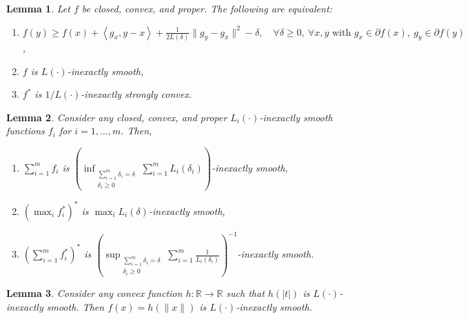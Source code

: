 \documentclass[10pt,a4paper]{amsart}
\newtheorem{lemma}{Lemma}
\newcommand{\R}{\mathbb{R}}
\newcommand{\inner}[2]{\left\langle {#1}, {#2} \right\rangle}
\begin{document}
\begin{lemma}\label{lemma:L(delta) conjugate equivalence}
    Let $f$ be closed, convex, and proper. The following are equivalent:
    \begin{enumerate}        
        \item $f(y) \geq f(x) + \inner{g_x}{y-x}+\frac{1}{2L(\delta)}\|g_y-g_x\|^2 - \delta, \quad \forall \delta \geq 0, \ \forall x,y \text{ with } g_x \in \partial f(x),\ g_y\in \partial f(y)$,
        \item $f$ is $L(\cdot)$-inexactly smooth,
        \item $f^*$ is $1/L(\cdot)$-inexactly strongly convex. %
    \end{enumerate}
\end{lemma}

\begin{lemma}\label{lemma:L(delta) sums and max calculus}
    Consider any closed, convex, and proper $L_i(\cdot)$-inexactly smooth functions $f_i$ for $i=1,\dots,m$. Then, \begin{enumerate}
        \item $\sum_{i=1}^m f_i$ is $\left(\inf_{\substack{\sum_{i=1}^m \delta_i = \delta\\ \delta_i \geq 0}} \sum_{i=1}^m L_i(\delta_i)\right)$-inexactly smooth,
        \item $(\max_i f_i^*)^*$ is $\max_i L_i(\delta)$-inexactly smooth,
        \item $\left(\sum_{i=1}^m f_i^*\right)^*$ is $\left(\sup_{\substack{\sum_{i=1}^m \delta_i = \delta\\ \delta_i \geq 0}} \sum_{i=1}^m \frac{1}{L_i(\delta_i)}\right)^{-1}$-inexactly smooth.
    \end{enumerate}
\end{lemma}

\begin{lemma}\label{composing with abs to norm}
    Consider any convex function $h : \R \to \R $ such that $h(|t|)$ is $L(\cdot)$-inexactly smooth. Then $f(x) = h(\|x\|)$ is $L(\cdot)$-inexactly smooth.  
\end{lemma}
\end{document}
